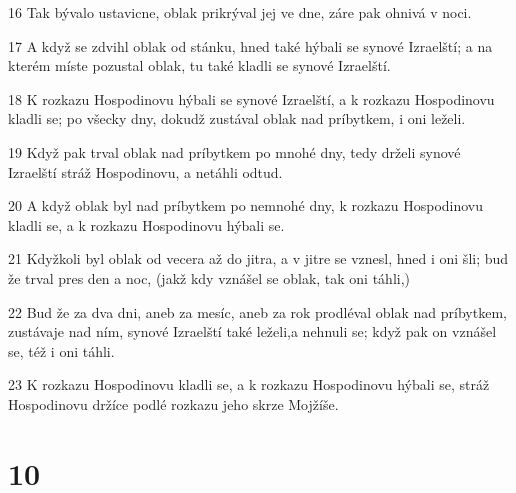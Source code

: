 \par 16 Tak bývalo ustavicne, oblak prikrýval jej ve dne, záre pak ohnivá v noci.
\par 17 A když se zdvihl oblak od stánku, hned také hýbali se synové Izraelští; a na kterém míste pozustal oblak, tu také kladli se synové Izraelští.
\par 18 K rozkazu Hospodinovu hýbali se synové Izraelští, a k rozkazu Hospodinovu kladli se; po všecky dny, dokudž zustával oblak nad príbytkem, i oni leželi.
\par 19 Když pak trval oblak nad príbytkem po mnohé dny, tedy drželi synové Izraelští stráž Hospodinovu, a netáhli odtud.
\par 20 A když oblak byl nad príbytkem po nemnohé dny, k rozkazu Hospodinovu kladli se, a k rozkazu Hospodinovu hýbali se.
\par 21 Kdyžkoli byl oblak od vecera až do jitra, a v jitre se vznesl, hned i oni šli; bud že trval pres den a noc, (jakž kdy vznášel se oblak, tak oni táhli,)
\par 22 Bud že za dva dni, aneb za mesíc, aneb za rok prodléval oblak nad príbytkem, zustávaje nad ním, synové Izraelští také leželi,a nehnuli se; když pak on vznášel se, též i oni táhli.
\par 23 K rozkazu Hospodinovu kladli se, a k rozkazu Hospodinovu hýbali se, stráž Hospodinovu držíce podlé rozkazu jeho skrze Mojžíše.

\chapter{10}


